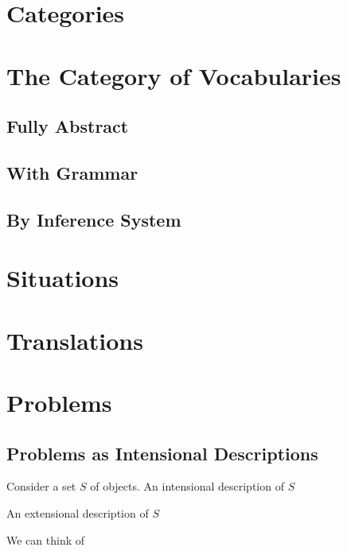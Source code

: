 \section{Categories}

\section{The Category of Vocabularies}

\subsection{Fully Abstract}

\subsection{With Grammar}


\subsection{By Inference System}

\section{Situations}

\section{Translations}


\section{Problems}

\subsection{Problems as Intensional Descriptions}

\begin{remark}
Consider a set $S$ of objects.
An intensional description of $S$

An extensional description of $S$
\end{remark}

\begin{remark}
We can think of 
\end{remark}

